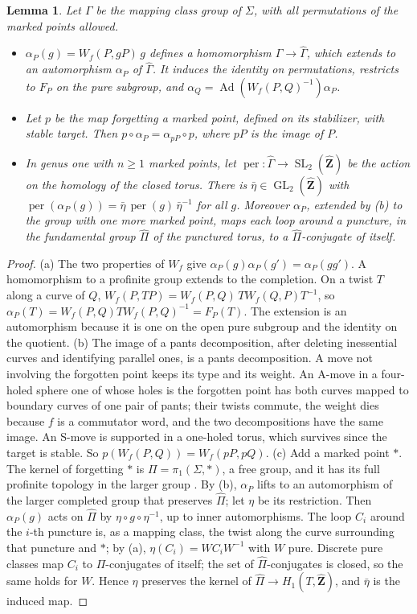 \documentclass[11pt,a4paper]{article}
\theoremstyle{plain}
\newtheorem{lemma}[theorem]{Lemma}
\theoremstyle{definition}
\theoremstyle{remark}
\newcommand{\Zh}{\widehat{\mathbf Z}}
\newcommand{\Ad}{\operatorname{Ad}}
\newcommand{\SL}{\operatorname{SL}}
\newcommand{\GL}{\operatorname{GL}}
\newcommand{\per}{\operatorname{per}}
\begin{document}
\begin{lemma}\label{lem:mixed}
Let $\Gamma$ be the mapping class group of $\Sigma$, with all permutations of the marked points allowed.
\begin{itemize}
\item[(a)] $\alpha_P(g)=W_f(P,gP)\,g$ defines a homomorphism $\Gamma\to\widehat\Gamma$, which extends to an
automorphism $\alpha_P$ of $\widehat\Gamma$. It induces the identity on permutations, restricts to $F_P$ on the
pure subgroup, and $\alpha_Q=\Ad(W_f(P,Q)^{-1})\alpha_P$.
\item[(b)] Let $p$ be the map forgetting a marked point, defined on its stabilizer, with stable target. Then
$p\circ\alpha_P=\alpha_{pP}\circ p$, where $pP$ is the image of $P$.
\item[(c)] In genus one with $n\ge1$ marked points, let $\per:\widehat\Gamma\to\SL_2(\Zh)$ be the action on the
homology of the closed torus. There is $\bar\eta\in\GL_2(\Zh)$ with
$\per(\alpha_P(g))=\bar\eta\,\per(g)\,\bar\eta^{-1}$ for all $g$. Moreover $\alpha_P$, extended by \textup{(b)} to
the group with one more marked point, maps each loop around a puncture, in the fundamental group $\widehat\Pi$ of
the punctured torus, to a $\widehat\Pi$-conjugate of itself.
\end{itemize}
\end{lemma}

\begin{proof}
(a) The two properties of $W_f$ give $\alpha_P(g)\alpha_P(g')=\alpha_P(gg')$. A homomorphism to a profinite
group extends to the completion. On a twist $T$ along a curve of $Q$, $W_f(P,TP)=W_f(P,Q)\,TW_f(Q,P)T^{-1}$, so
$\alpha_P(T)=W_f(P,Q)TW_f(P,Q)^{-1}=F_P(T)$. The extension is an automorphism because it is one on the open pure
subgroup \cite[Theorem 4]{HLS} and the identity on the quotient. (b) The image of a pants decomposition, after
deleting inessential curves and identifying parallel ones, is a pants decomposition. A move not involving the
forgotten point keeps its type and its weight. An A-move in a four-holed sphere one of whose holes is the
forgotten point has both curves mapped to boundary curves of one pair of pants; their twists commute, the weight
dies because $f$ is a commutator word, and the two decompositions have the same image. An S-move is supported in a
one-holed torus, which survives since the target is stable. So $p(W_f(P,Q))=W_f(pP,pQ)$. (c) Add a marked
point $*$. The kernel of forgetting $*$ is $\Pi=\pi_1(\Sigma,*)$, a free group, and it has its full profinite
topology in the larger group \cite{A}. By (b), $\alpha_P$ lifts to an automorphism of the larger completed group
that preserves $\widehat\Pi$; let $\eta$ be its restriction. Then $\alpha_P(g)$ acts on $\widehat\Pi$ by
$\eta\circ g\circ\eta^{-1}$, up to inner automorphisms. The loop $C_i$ around the $i$-th puncture is, as a mapping
class, the twist along the curve surrounding that puncture and $*$; by (a), $\eta(C_i)=WC_iW^{-1}$ with $W$ pure.
Discrete pure classes map $C_i$ to $\Pi$-conjugates of itself; the set of $\widehat\Pi$-conjugates is closed, so
the same holds for $W$. Hence $\eta$ preserves the kernel of $\widehat\Pi\to H_1(T,\Zh)$, and $\bar\eta$ is the
induced map.
\end{proof}
\end{document}
